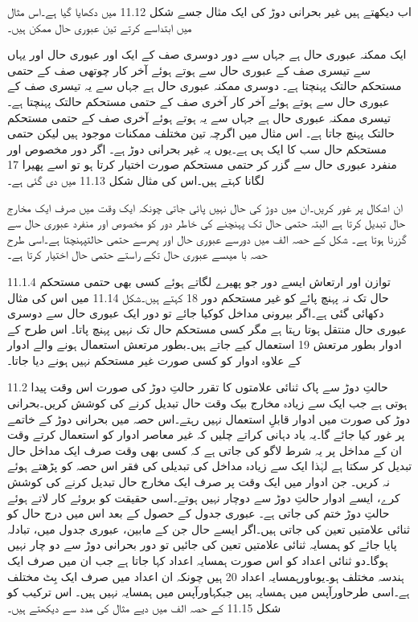 	اب دیکھتے ہیں غیر بحرانی دوڑ کی ایک مثال جسے شکل 11.12 میں دکھایا گیا ہے۔اس مثال میں ابتداسے کرتے تین عبوری حال  ممکن ہیں۔


	ایک ممکنہ عبوری حال  ہے جہاں سے دور دوسری صف کے ایک اور عبوری حال اور یہاں سے تیسری صف کے عبوری حال سے ہوتے ہوئے آخر کار  چوتھی صف کے حتمی مستحکم حالتک پہنچتا ہے۔
	دوسری ممکنہ عبوری حال ہے جہاں سے یہ تیسری صف کے عبوری حال سے ہوتے ہوئے آخر کار آخری صف کے حتمی مستحکم حالتک پہنچتا ہے۔
	تیسری ممکنہ عبوری حال ہے جہاں سے یہ ہوتے ہوئے آخری صف کے حتمی مستحکم حالتک پہنچ جاتا ہے۔
	اس مثال میں اگرچہ تین مختلف ممکنات موجود ہیں لیکن حتمی مستحکم حال سب کا ایک ہی ہے۔یوں یہ غیر بحرانی دوڑ ہے۔  
	اگر دور مخصوص اور منفرد عبوری حال   سے گزر کر حتمی مستحکم صورت اختیار کرتا ہو تو اسے پھیرا 17 لگانا کہتے ہیں۔اس کی مثال شکل 11.13 میں دی گئی ہے۔ 


	ان اشکال پر غور کریں۔ان میں دوڑ کی حال نہیں پائی جاتی چونکہ ایک وقت میں صرف ایک مخارج حال تبدیل کرتا ہے البتہ حتمی حال تک پہنچنے کی خاطر دور کو مخصوص اور منفرد عبوری حال   سے گزرنا ہوتا ہے۔
	شکل کے حصہ الف میں دورسے عبوری حال  اور پھرسے حتمی حالتپہنچتا ہے۔اسی طرح حصہ با میںسے   عبوری حال تکے راستے حتمی حال اختیار کرتا ہے۔

11.1.4 توازن اور ارتعاش 
	 ایسے دور جو پھیرے لگاتے ہوئے کسی بھی حتمی مستحکم حال تک نہ پہنچ پائے کو غیر مستحکم دور 18 کہتے ہیں۔شکل 11.14 میں اس کی مثال دکھائی گئی ہے۔اگر بیرونی مداخل کوکیا جائے تو دور ایک عبوری حال  سے دوسری عبوری حال  منتقل ہوتا رہتا ہے مگر کسی مستحکم حال تک نہیں پہنچ پاتا۔
	اس طرح کے ادوار بطور مرتعش 19 استعمال کیے جاتے ہیں۔بطور مرتعش استعمال ہونے والے ادوار کے علاوہ ادوار کو کسی صورت غیر مستحکم نہیں ہونے دیا جاتا۔

11.2 حالتِ دوڑ سے پاک ثنائی علامتوں کا تقرر
	حالتِ دوڑ کی صورت اس وقت پیدا ہوتی ہے جب ایک سے زیادہ مخارج بیک وقت حال تبدیل کرنے کی کوشش کریں۔بحرانی دوڑ کی صورت میں ادوار قابلِ استعمال نہیں رہتے۔اس حصہ میں بحرانی دوڑ کے خاتمے پر غور کیا جائے گا۔یہ یاد دہانی کراتے چلیں کہ غیر معاصر ادوار کو استعمال کرتے وقت ان کے مداخل پر یہ شرط لاگو کی جاتی ہے کہ کسی بھی وقت صرف ایک مداخل حال تبدیل کر سکتا ہے لہٰذا ایک سے زیادہ مداخل کی تبدیلی کی فقر اس حصہ کو پڑھتے ہوئے نہ کریں۔
	جن ادوار میں ایک وقت پر صرف ایک مخارج حال تبدیل کرنے کی کوشش کرے، ایسے ادوار حالتِ دوڑ سے دوچار نہیں ہوتے۔اسی حقیقت کو بروئے کار لاتے ہوئے حالتِ دوڑ ختم کی جاتی ہے۔
	عبوری جدول کے حصول کے بعد اس میں درج حال  کو ثنائی علامتیں تعین کی جاتی ہیں۔اگر ایسے حال جن کے مابین، عبوری جدول میں، تبادلہ پایا جائے کو  ہمسایہ ثنائی علامتیں تعین کی جائیں تو دور بحرانی دوڑ سے دو چار نہیں ہوگا۔دو ثنائی اعداد کو اس صورت ہمسایہ اعداد کہا جاتا ہے جب ان میں صرف ایک ہندسہ مختلف ہو۔یوںاورہمسایہ اعداد 20 ہیں چونکہ ان اعداد میں صرف ایک بِٹ مختلف ہے۔اسی طرحاورآپس میں ہمسایہ ہیں جبکہاورآپس میں ہمسایہ نہیں ہیں۔
	اس ترکیب کو شکل 11.15 کے حصہ الف میں دیے مثال کی مدد سے دیکھتے ہیں۔



